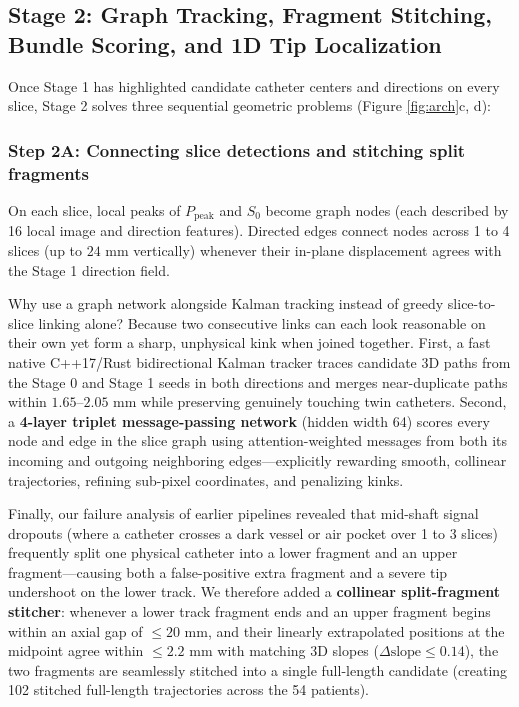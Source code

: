 \documentclass[
  11pt,
]{article}
\begin{document}
\subsection{Stage 2: Graph Tracking, Fragment Stitching, Bundle Scoring,
and 1D Tip
Localization}\label{stage-2-graph-tracking-fragment-stitching-bundle-scoring-and-1d-tip-localization}

Once Stage 1 has highlighted candidate catheter centers and directions
on every slice, Stage 2 solves three sequential geometric problems
(Figure \ref{fig:arch}c, d):

\subsubsection{Step 2A: Connecting slice detections and stitching split
fragments}\label{step-2a-connecting-slice-detections-and-stitching-split-fragments}

On each slice, local peaks of \(P_{\text{peak}}\) and \(S_0\) become
graph nodes (each described by 16 local image and direction features).
Directed edges connect nodes across 1 to 4 slices (up to
\(24\text{ mm}\) vertically) whenever their in-plane displacement agrees
with the Stage 1 direction field.

Why use a graph network alongside Kalman tracking instead of greedy
slice-to-slice linking alone? Because two consecutive links can each
look reasonable on their own yet form a sharp, unphysical kink when
joined together. First, a fast native C++17/Rust bidirectional Kalman
tracker traces candidate 3D paths from the Stage 0 and Stage 1 seeds in
both directions and merges near-duplicate paths within
\(1.65\text{--}2.05\text{ mm}\) while preserving genuinely touching twin
catheters. Second, a \textbf{4-layer triplet message-passing network}
(hidden width 64) scores every node and edge in the slice graph using
attention-weighted messages from both its incoming and outgoing
neighboring edges---explicitly rewarding smooth, collinear trajectories,
refining sub-pixel coordinates, and penalizing kinks.

Finally, our failure analysis of earlier pipelines revealed that
mid-shaft signal dropouts (where a catheter crosses a dark vessel or air
pocket over 1 to 3 slices) frequently split one physical catheter into a
lower fragment and an upper fragment---causing both a false-positive
extra fragment and a severe tip undershoot on the lower track. We
therefore added a \textbf{collinear split-fragment stitcher}: whenever a
lower track fragment ends and an upper fragment begins within an axial
gap of \(\le 20\text{ mm}\), and their linearly extrapolated positions
at the midpoint agree within \(\le 2.2\text{ mm}\) with matching 3D
slopes (\(\Delta \text{slope} \le 0.14\)), the two fragments are
seamlessly stitched into a single full-length candidate (creating 102
stitched full-length trajectories across the 54 patients).
\end{document}

